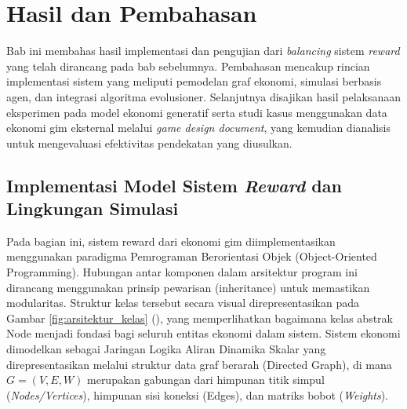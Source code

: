 \chapter{Hasil dan Pembahasan}\label{ch:result}

Bab ini membahas hasil implementasi dan pengujian dari \textit{balancing} sistem \textit{reward} yang telah dirancang pada bab sebelumnya. Pembahasan mencakup rincian implementasi sistem yang meliputi pemodelan graf ekonomi, simulasi berbasis agen, dan integrasi algoritma evolusioner. Selanjutnya disajikan hasil pelaksanaan eksperimen pada model ekonomi generatif serta studi kasus menggunakan data ekonomi gim eksternal melalui \textit{game design document}, yang kemudian dianalisis untuk mengevaluasi efektivitas pendekatan yang diusulkan.

\section{Implementasi Model Sistem \textit{Reward} dan Lingkungan Simulasi}
Pada bagian ini, sistem reward dari ekonomi gim diimplementasikan menggunakan paradigma Pemrograman Berorientasi Objek (Object-Oriented Programming). Hubungan antar komponen dalam arsitektur program ini dirancang menggunakan prinsip pewarisan (inheritance) untuk memastikan modularitas. Struktur kelas tersebut secara visual direpresentasikan pada Gambar \ref{fig:arsitektur_kelas} (), yang memperlihatkan bagaimana kelas abstrak Node menjadi fondasi bagi seluruh entitas ekonomi dalam sistem. Sistem ekonomi dimodelkan sebagai Jaringan Logika Aliran Dinamika Skalar yang direpresentasikan melalui struktur data graf berarah (Directed Graph), di mana $G = (V, E, W)$ merupakan gabungan dari himpunan titik simpul (\textit{Nodes/Vertices}), himpunan sisi koneksi (Edges), dan matriks bobot (\textit{Weights}).


